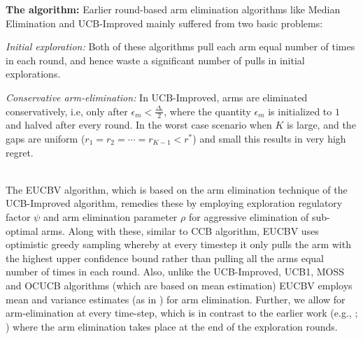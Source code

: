 \documentclass[MS,synopsis]{iitmdiss}
\begin{document}
\textbf{The algorithm:} Earlier round-based arm elimination algorithms like Median Elimination \citep{even2006action} and UCB-Improved mainly suffered from two basic problems: \\
\begin{inparaenum}[\bfseries(i)]
\item \textit{Initial exploration:} Both of these algorithms pull each arm equal number of times in each round, and hence waste a significant number of pulls in initial explorations. \\
\item \textit{Conservative arm-elimination:} In UCB-Improved, arms are eliminated conservatively, i.e, only after $\epsilon_{m}<\frac{\Delta_{i}}{2}$, 
where the quantity $\epsilon_{m}$ is initialized to $1$ and halved after every round. In the worst case scenario when $K$ is large, and the gaps are uniform  ($r_{1}=r_{2}=\cdots=r_{K-1}<r^{*}$) and small this results in very high regret.\\
\end{inparaenum}
\\
	The EUCBV algorithm, which is based on the arm elimination technique of the UCB-Improved algorithm,  remedies these by employing exploration regulatory factor $\psi$ and arm elimination parameter $\rho$ for aggressive elimination of sub-optimal arms. Along with these, similar to CCB \citep{liu2016modification} algorithm, EUCBV uses optimistic greedy sampling whereby at every timestep it only pulls the arm with the highest upper confidence bound rather than pulling all the arms equal number of times in each round. Also, unlike the UCB-Improved, UCB1, MOSS and OCUCB algorithms (which are based on mean estimation) EUCBV employs mean and variance estimates (as in \citet{audibert2009exploration}) for arm elimination. Further, we allow for arm-elimination at every time-step, which is in contrast to the earlier work (e.g., \citet{auer2010ucb}; \citet{even2006action}) where the arm elimination takes place at the end of the exploration rounds. 
	
%	
\end{document}

